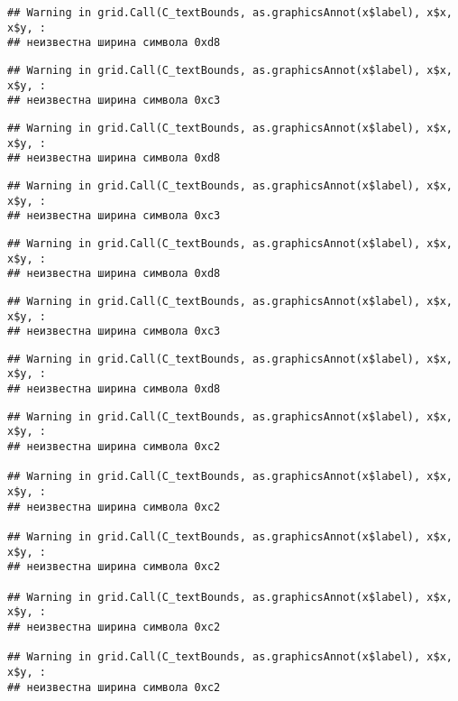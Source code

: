 \documentclass[
]{article}
\begin{document}
\begin{verbatim}
## Warning in grid.Call(C_textBounds, as.graphicsAnnot(x$label), x$x, x$y, :
## неизвестна ширина символа 0xd8
\end{verbatim}

\begin{verbatim}
## Warning in grid.Call(C_textBounds, as.graphicsAnnot(x$label), x$x, x$y, :
## неизвестна ширина символа 0xc3
\end{verbatim}

\begin{verbatim}
## Warning in grid.Call(C_textBounds, as.graphicsAnnot(x$label), x$x, x$y, :
## неизвестна ширина символа 0xd8
\end{verbatim}

\begin{verbatim}
## Warning in grid.Call(C_textBounds, as.graphicsAnnot(x$label), x$x, x$y, :
## неизвестна ширина символа 0xc3
\end{verbatim}

\begin{verbatim}
## Warning in grid.Call(C_textBounds, as.graphicsAnnot(x$label), x$x, x$y, :
## неизвестна ширина символа 0xd8
\end{verbatim}

\begin{verbatim}
## Warning in grid.Call(C_textBounds, as.graphicsAnnot(x$label), x$x, x$y, :
## неизвестна ширина символа 0xc3
\end{verbatim}

\begin{verbatim}
## Warning in grid.Call(C_textBounds, as.graphicsAnnot(x$label), x$x, x$y, :
## неизвестна ширина символа 0xd8
\end{verbatim}

\begin{verbatim}
## Warning in grid.Call(C_textBounds, as.graphicsAnnot(x$label), x$x, x$y, :
## неизвестна ширина символа 0xc2

## Warning in grid.Call(C_textBounds, as.graphicsAnnot(x$label), x$x, x$y, :
## неизвестна ширина символа 0xc2

## Warning in grid.Call(C_textBounds, as.graphicsAnnot(x$label), x$x, x$y, :
## неизвестна ширина символа 0xc2

## Warning in grid.Call(C_textBounds, as.graphicsAnnot(x$label), x$x, x$y, :
## неизвестна ширина символа 0xc2

## Warning in grid.Call(C_textBounds, as.graphicsAnnot(x$label), x$x, x$y, :
## неизвестна ширина символа 0xc2
\end{verbatim}
\end{document}
